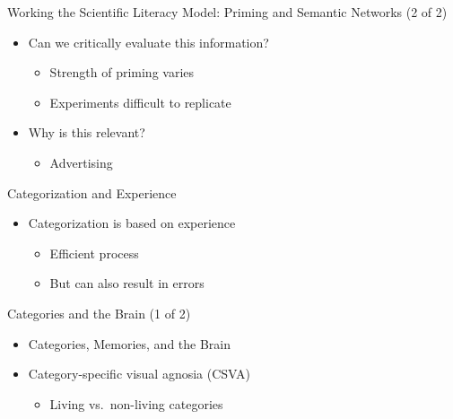 \documentclass[
]{book}
\providecommand{\tightlist}{%
  \setlength{\itemsep}{0pt}\setlength{\parskip}{0pt}}
\begin{document}
Working the Scientific Literacy Model: Priming and Semantic
Networks (2 of 2)

\begin{itemize}
\tightlist
\item
  Can we critically evaluate this information?

  \begin{itemize}
  \tightlist
  \item
    Strength of priming varies\\
  \item
    Experiments difficult to replicate\\
  \end{itemize}
\item
  Why is this relevant?

  \begin{itemize}
  \tightlist
  \item
    Advertising
  \end{itemize}
\end{itemize}

Categorization and Experience

\begin{itemize}
\tightlist
\item
  Categorization is based on experience

  \begin{itemize}
  \tightlist
  \item
    Efficient process\\
  \item
    But can also result in errors
  \end{itemize}
\end{itemize}

Categories and the Brain (1 of 2)

\begin{itemize}
\tightlist
\item
  Categories, Memories, and the Brain\\
\item
  Category-specific visual agnosia (CSVA)

  \begin{itemize}
  \tightlist
  \item
    Living vs.~non-living categories
  \end{itemize}
\end{itemize}
\end{document}
